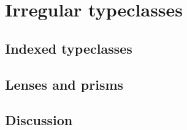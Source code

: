 
\chapter{Irregular typeclasses}

\section{Indexed typeclasses}

\section{Lenses and prisms}

\section{Discussion}

\begin{comment}
\end{comment}

